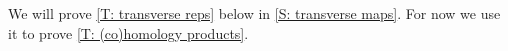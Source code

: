 We will prove \cref{T: transverse reps} below in \cref{S: transverse maps}.
For now we use it to prove \cref{T: (co)homology products}.

